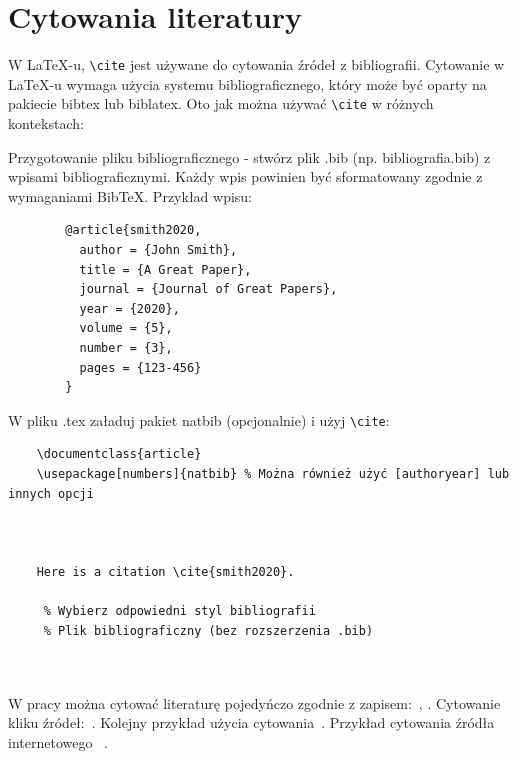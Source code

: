 


\section{Cytowania literatury}

W LaTeX-u, \texttt{\textbackslash cite} jest używane do cytowania źródeł z bibliografii. Cytowanie w LaTeX-u wymaga użycia systemu bibliograficznego, który może być oparty na pakiecie bibtex lub biblatex. Oto jak można używać \texttt{\textbackslash cite} w różnych kontekstach:

Przygotowanie pliku bibliograficznego - stwórz plik .bib (np. bibliografia.bib) z wpisami bibliograficznymi. Każdy wpis powinien być sformatowany zgodnie z wymaganiami BibTeX. Przykład wpisu:
\begin{verbatim}
        @article{smith2020,
          author = {John Smith},
          title = {A Great Paper},
          journal = {Journal of Great Papers},
          year = {2020},
          volume = {5},
          number = {3},
          pages = {123-456}
        }
        \end{verbatim}

W pliku .tex załaduj pakiet natbib (opcjonalnie) i użyj \texttt{\textbackslash cite}:

\begin{verbatim}
    \documentclass{article}
    \usepackage[numbers]{natbib} % Można również użyć [authoryear] lub innych opcji

    

    Here is a citation \cite{smith2020}.

     % Wybierz odpowiedni styl bibliografii
     % Plik bibliograficzny (bez rozszerzenia .bib)

    

\end{verbatim}



W pracy można cytować literaturę pojedyńczo zgodnie z zapisem:~\cite{ARM06}, \cite{WEI2026131611}. Cytowanie kliku źródeł:~\cite{ARM06,COCCHIERI2026131725,app14177462,PeDa04}. Kolejny przykład użycia cytowania~\cite{Dil00,Lam92}. Przykład cytowania źródła internetowego~\cite{example2024} \cite{MendeleyExample}.


